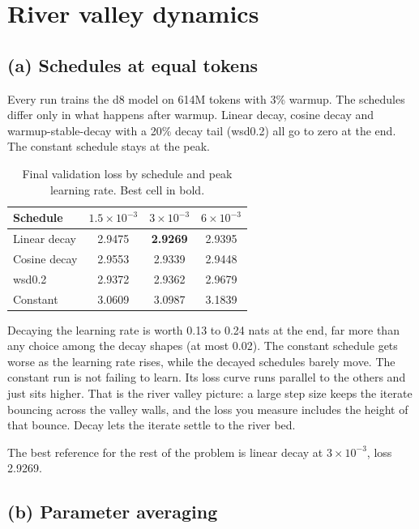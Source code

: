 \documentclass[10pt,letterpaper]{article}
\begin{document}
\section{River valley dynamics}

\subsection*{(a) Schedules at equal tokens}

Every run trains the d8 model on 614M tokens with 3\% warmup. The schedules differ only in what happens after warmup. Linear decay, cosine decay and warmup-stable-decay with a 20\% decay tail (wsd0.2) all go to zero at the end. The constant schedule stays at the peak.

\begin{table}[H]\centering\small
\caption{Final validation loss by schedule and peak learning rate. Best cell in bold.}
\begin{tabular}{lccc}\toprule
Schedule & $1.5\times10^{-3}$ & $3\times10^{-3}$ & $6\times10^{-3}$\\\midrule
Linear decay & 2.9475 & \textbf{2.9269} & 2.9395\\
Cosine decay & 2.9553 & 2.9339 & 2.9448\\
wsd0.2 & 2.9372 & 2.9362 & 2.9679\\
Constant & 3.0609 & 3.0987 & 3.1839\\\bottomrule
\end{tabular}
\end{table}

Decaying the learning rate is worth 0.13 to 0.24 nats at the end, far more than any choice among the decay shapes (at most 0.02). The constant schedule gets worse as the learning rate rises, while the decayed schedules barely move. The constant run is not failing to learn. Its loss curve runs parallel to the others and just sits higher. That is the river valley picture: a large step size keeps the iterate bouncing across the valley walls, and the loss you measure includes the height of that bounce. Decay lets the iterate settle to the river bed.

The best reference for the rest of the problem is linear decay at $3\times10^{-3}$, loss 2.9269.

\subsection*{(b) Parameter averaging}
\end{document}

